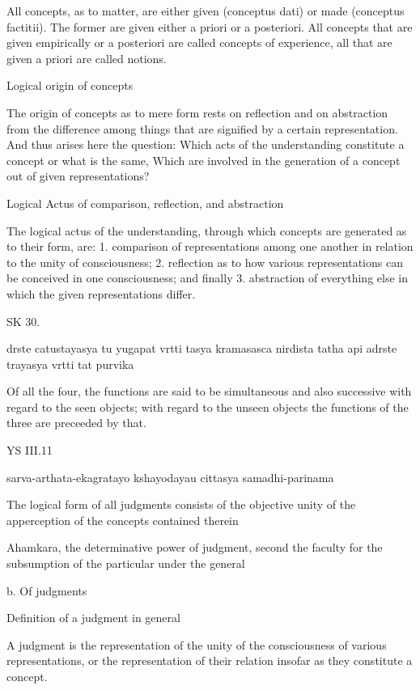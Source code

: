         All concepts, as to matter, are either
        given (conceptus dati) or made (conceptus factitii).
        The former are given either a priori or a posteriori.
        All concepts that are given empirically or a posteriori
        are called concepts of experience,
        all that are given a priori are called notions.

    Logical origin of concepts

        The origin of concepts as to mere form rests on reflection
        and on abstraction from the difference among things
        that are signified by a certain representation.
        And thus arises here the question:
        Which acts of the understanding constitute a concept
        or what is the same,
        Which are involved in the generation of a concept
        out of given representations?

    Logical Actus of comparison, reflection, and abstraction

        The logical actus of the understanding,
        through which concepts are generated as to their form, are:
        1.  comparison of representations among one another
            in relation to the unity of consciousness;
        2.  reflection as to how various representations can
            be conceived in one consciousness; and finally
        3.  abstraction of everything else
            in which the given representations differ.

SK 30.

drste catustayasya tu yugapat vrtti tasya kramasasca nirdista
tatha api adrste trayasya vrtti tat purvika

Of all the four, the functions are said to be
simultaneous and also successive
with regard to the seen objects;
with regard to the unseen objects
the functions of the three are preceeded by that.

YS III.11

    sarva-arthata-ekagratayo kshayodayau cittasya samadhi-parinama

    The logical form of all judgments consists of the objective unity of
    the apperception of the concepts contained therein

    Ahamkara, the determinative power of judgment,
    second the faculty for the subsumption of
    the particular under the general

    b. Of judgments

    Definition of a judgment in general

        A judgment is the representation of the unity of
        the consciousness of various representations,
        or the representation of their relation
        insofar as they constitute a concept.

